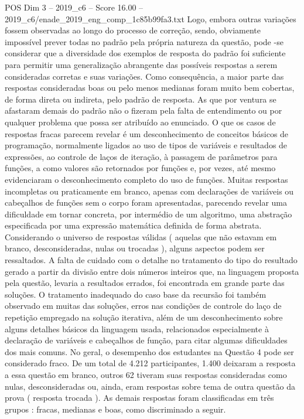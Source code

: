 \begin{textsample}{POS Dim 3 – 2019\_c6 – Score 16.00 – 2019\_c6/enade\_2019\_eng\_comp\_1c85b99fa3.txt}
Logo, embora outras variações fossem observadas ao longo do processo de correção, sendo, obviamente impossível prever todas no padrão pela própria natureza da questão, pode -se considerar que a diversidade dos exemplos de resposta do padrão foi suficiente para permitir uma generalização abrangente das possíveis respostas a serem consideradas corretas e suas variações.
Como consequência, a maior parte das respostas consideradas boas ou pelo menos medianas foram muito bem cobertas, de forma direta ou indireta, pelo padrão de resposta.
As que por ventura se afastaram demais do padrão não o fizeram pela falta de entendimento ou por qualquer problema que possa ser atribuído ao enunciado.
O que os casos de respostas fracas parecem revelar é um desconhecimento de conceitos básicos de programação, normalmente ligados ao uso de tipos de variáveis e resultados de expressões, ao controle de laços de iteração, à passagem de parâmetros para funções, a como valores são retornados por funções e, por vezes, até mesmo evidenciaram o desconhecimento completo do uso de funções.
Muitas respostas incompletas ou praticamente em branco, apenas com declarações de variáveis ou cabeçalhos de funções sem o corpo foram apresentadas, parecendo revelar uma dificuldade em tornar concreta, por intermédio de um algoritmo, uma abstração especificada por uma expressão matemática definida de forma abstrata.
Considerando o universo de respostas válidas ( aquelas que não estavam em branco, desconsideradas, nulas ou trocadas ), alguns aspectos podem ser ressaltados.
A falta de cuidado com o detalhe no tratamento do tipo do resultado gerado a partir da divisão entre dois números inteiros que, na linguagem proposta pela questão, levaria a resultados errados, foi encontrada em grande parte das soluções.
O tratamento inadequado do caso base da recursão foi também observado em muitas das soluções, erros nas condições de controle do laço de repetição empregado na solução iterativa, além de um desconhecimento sobre alguns detalhes básicos da linguagem usada, relacionados especialmente à declaração de variáveis e cabeçalhos de função, para citar algumas dificuldades dos mais comuns.
No geral, o desempenho dos estudantes na Questão 4 pode ser considerado fraco.
De um total de 4.212 participantes, 1.400 deixaram a resposta a essa questão em branco, outros 62 tiveram suas respostas consideradas como nulas, desconsideradas ou, ainda, eram respostas sobre tema de outra questão da prova ( resposta trocada ).
As demais respostas foram classificadas em três grupos : fracas, medianas e boas, como discriminado a seguir.

\end{textsample}
